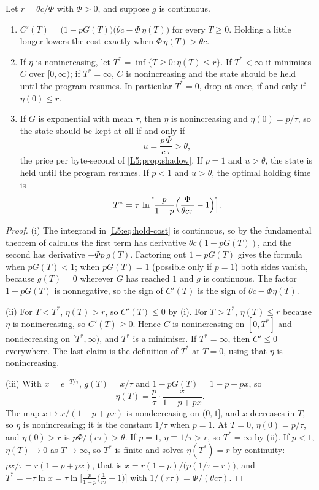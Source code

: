 \begin{proposition}\label{L5:prop:hold}
Let $r=\theta c/\Phi$ with $\Phi>0$, and suppose $g$ is continuous.
\begin{enumerate}[label=(\roman*)]
\item $C'(T)=\bigl(1-pG(T)\bigr)\bigl(\theta c-\Phi\,\eta(T)\bigr)$ for every $T\ge0$.
  Holding a little longer lowers the cost exactly when $\Phi\,\eta(T)>\theta c$.
\item If $\eta$ is nonincreasing, let $T^*=\inf\{T\ge0:\eta(T)\le r\}$. If
  $T^*<\infty$ it minimises $C$ over $[0,\infty)$; if $T^*=\infty$, $C$ is nonincreasing
  and the state should be held until the program resumes. In particular $T^*=0$, drop at
  once, if and only if $\eta(0)\le r$.
\item If $G$ is exponential with mean $\tau$, then $\eta$ is nonincreasing and
  $\eta(0)=p/\tau$, so the state should be kept at all if and only if
  \[
    u=\frac{p\,\Phi}{c\,\tau}>\theta ,
  \]
  the price per byte-second of \cref{L5:prop:shadow}. If $p=1$ and $u>\theta$, the
  state is held until the program resumes. If $p<1$ and $u>\theta$, the optimal holding
  time is
  \[
    T^*=\tau\,\ln\Bigl[\frac{p}{1-p}\Bigl(\frac{\Phi}{\theta c\tau}-1\Bigr)\Bigr].
  \]
\end{enumerate}
\end{proposition}

\begin{proof}
(i) The integrand in \eqref{L5:eq:hold-cost} is continuous, so by the fundamental
theorem of calculus the first term has derivative $\theta c(1-pG(T))$, and the second
has derivative $-\Phi p\,g(T)$. Factoring out $1-pG(T)$ gives the formula when
$pG(T)<1$; when $pG(T)=1$ (possible only if $p=1$) both sides vanish, because
$g(T)=0$ wherever $G$ has reached $1$ and $g$ is continuous. The factor $1-pG(T)$ is
nonnegative, so the sign of $C'(T)$ is the sign of $\theta c-\Phi\eta(T)$.

(ii) For $T<T^*$, $\eta(T)>r$, so $C'(T)\le0$ by (i). For $T>T^*$, $\eta(T)\le r$
because $\eta$ is nonincreasing, so $C'(T)\ge0$. Hence $C$ is nonincreasing on
$[0,T^*]$ and nondecreasing on $[T^*,\infty)$, and $T^*$ is a minimiser. If
$T^*=\infty$, then $C'\le0$ everywhere. The last claim is the definition of $T^*$ at
$T=0$, using that $\eta$ is nonincreasing.

(iii) With $x=e^{-T/\tau}$, $g(T)=x/\tau$ and $1-pG(T)=1-p+px$, so
\[
  \eta(T)=\frac{p}{\tau}\cdot\frac{x}{1-p+px}.
\]
The map $x\mapsto x/(1-p+px)$ is nondecreasing on $(0,1]$, and $x$ decreases in $T$,
so $\eta$ is nonincreasing; it is the constant $1/\tau$ when $p=1$. At $T=0$,
$\eta(0)=p/\tau$, and $\eta(0)>r$ is $p\Phi/(c\tau)>\theta$. If $p=1$, $\eta\equiv1/\tau>r$,
so $T^*=\infty$ by (ii). If $p<1$, $\eta(T)\to0$ as $T\to\infty$, so $T^*$ is finite and
solves $\eta(T^*)=r$ by continuity:
$px/\tau=r(1-p+px)$, that is $x=r(1-p)/\bigl(p(1/\tau-r)\bigr)$, and
$T^*=-\tau\ln x=\tau\ln\bigl[\frac{p}{1-p}\bigl(\frac{1}{r\tau}-1\bigr)\bigr]$ with
$1/(r\tau)=\Phi/(\theta c\tau)$.
\end{proof}

